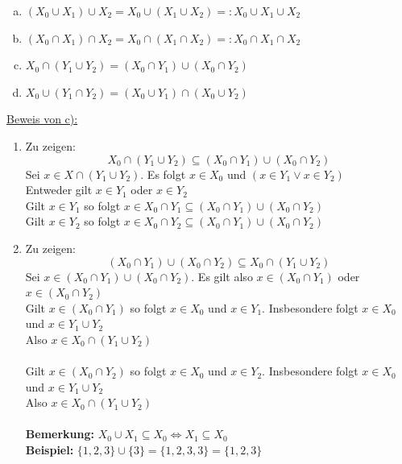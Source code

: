 \begin{enumerate}[a)] 
\item \( ( X_0 \cup X_1 ) \cup X_2 = X_0 \cup ( X_1 \cup X_2 ) =: X_0 \cup X_1 \cup X_2 \)
\item \( ( X_0 \cap X_1 ) \cap X_2 = X_0 \cap ( X_1 \cap X_2 ) =: X_0 \cap X_1 \cap X_2 \)
\item \( X_0 \cap ( Y_1 \cup Y_2 ) = ( X_0 \cap Y_1) \cup ( X_0 \cap Y_2 ) \) 
\item \( X_0 \cup ( Y_1 \cap Y_2 ) = ( X_0 \cup Y_1) \cap ( X_0 \cup Y_2 ) \) 
\end{enumerate}
\underline{Beweis von c):}  
\begin{enumerate}[(1)]
\item Zu zeigen:
\[
X_0 \cap ( Y_1 \cup Y_2 ) \subseteq ( X_0 \cap Y_1) \cup ( X_0 \cap Y_2 )
\]
Sei \(x \in X \cap (Y_1 \cup Y_2) \). Es folgt \(x \in X_0\) und \( (x \in Y_1 \vee x \in Y_2)\) \\
Entweder gilt \(x \in Y_1\) oder \(x \in Y_2\) \\
Gilt \(x \in Y_1\) so folgt \( x \in X_0 \cap Y_1 \subseteq (X_0 \cap Y_1) \cup (X_0 \cap Y_2) \) \\
Gilt \(x \in Y_2\) so folgt \( x \in X_0 \cap Y_2 \subseteq (X_0 \cap Y_1) \cup (X_0 \cap Y_2) \) 

\item Zu zeigen:
\[
( X_0 \cap Y_1) \cup ( X_0 \cap Y_2 ) \subseteq X_0 \cap ( Y_1 \cup Y_2 )
\]
Sei \(x \in (X_0 \cap Y_1 ) \cup (X_0 \cap Y_2) \). Es gilt also \( x \in (X_0 \cap Y_1) \) oder \( x \in (X_0 \cap Y_2) \) \\
Gilt \( x \in (X_0 \cap Y_1) \) so folgt \(x \in X_0\) und \(x \in Y_1\). Insbesondere folgt \(x \in X_0\) und \(x \in Y_1 \cup Y_2\) \\
Also \(x \in X_0 \cap (Y_1 \cup Y_2)\) \\
\\
Gilt  \( x \in (X_0 \cap Y_2) \) so folgt \(x \in X_0\) und \(x \in Y_2\). Insbesondere folgt \(x \in X_0\) und \(x \in Y_1 \cup Y_2\) \\
Also \(x \in X_0 \cap (Y_1 \cup Y_2)\) \\
\\
\textbf{Bemerkung:} \( X_0 \cup X_1 \subseteq X_0 \Leftrightarrow X_1 \subseteq X_0\) \\
\textbf{Beispiel:} \( \{ 1,2,3\}\cup \{3\} = \{1,2,3,3\} = \{ 1,2,3\} \)
\end{enumerate}


